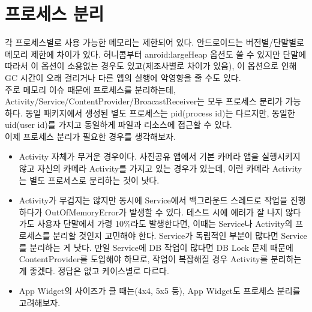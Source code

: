 \begin{comment}
startService 하는 경우가 있는데, 어차피 시작 Activity의 onResume 이후에 실행된다. 따라서 Application에 꼭 넣을 것인지, 시작 Activity에 할 것인지 따져봐야 한다. 왜냐하면 Application.onCreate는 앱이 죽어 있을 때도 BroadcastReceiver, Service, ContentProvider를 다른 앱에서 사용하고자 할 때도 실행하기 때문이다.

restore/full backup일때는 우리가 만든 Application.onCreate를 타지 않는다.

ActivityThread.main
	ActivityThread.attach
	ActivityManagerService.attachApplication
		ActivityManagerService.attacheApplicationLocked
			IApplicationThread.bindApplication
			
\end{comment}

\section{프로세스 분리}
각 프로세스별로 사용 가능한 메모리는 제한되어 있다. 안드로이드는 버전별/단말별로 메모리 제한에 차이가 있다.
허니콤부터 anroid:largeHeap 옵션도 쓸 수 있지만 단말에 따라서 이 옵션이 소용없는 경우도 있고(제조사별로 차이가 있음), 이 옵션으로 인해 GC 시간이 오래 걸리거나 다른 앱의 실행에 악영향을 줄 수도 있다.\\ 

주로 메모리 이슈 때문에 프로세스를 분리하는데, Activity/Service/ContentProvider/BroacastReceiver는 모두 프로세스 분리가 가능하다.
동일 패키지에서 생성된 별도 프로세스는 pid(process id)는 다르지만, 동일한 uid(user id)를 가지고 동일하게 파일과 리소스에 접근할 수 있다.\\

이제 프로세스 분리가 필요한 경우를 생각해보자.
\begin{itemize}
\item Activity 자체가 무거운 경우이다. 사진공유 앱에서 기본 카메라 앱을 실행시키지 않고 자신의 카메라 Activity를 가지고 있는 경우가 있는데, 이런 카메라 Activity는 별도 프로세스로 분리하는 것이 낫다.

\item Activity가 무겁지는 않지만 동시에 Service에서 백그라운드 스레드로 작업을 진행하다가 OutOfMemoryError가 발생할 수 있다. 테스트 시에 에러가 잘 나지 않다가도 사용자 단말에서 가령 10\%라도 발생한다면, 이때는 Service나 Activity의 프로세스를 분리할 것인지 고민해야 한다.
Service가 독립적인 부분이 많다면 Service를 분리하는 게 낫다. 만일 Service에 DB 작업이 많다면 DB Lock 문제 때문에 ContentProvider를 도입해야 하므로, 작업이 복잡해질 경우 Activity를 분리하는 게 좋겠다. 정답은 없고 케이스별로 다르다.

\item App Widget의 사이즈가 클 때는(4x4, 5x5 등), App Widget도 프로세스 분리를 고려해보자.
\end{itemize}

